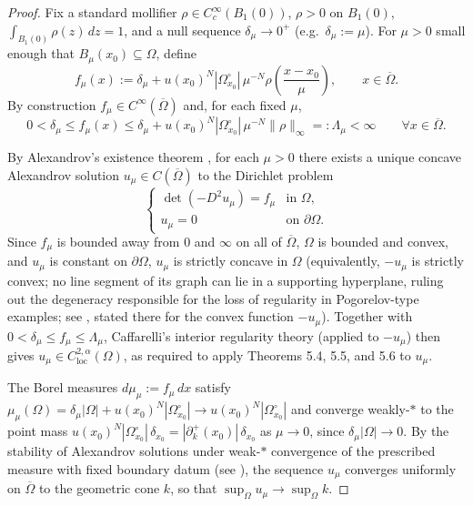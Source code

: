 \documentclass{article}
\numberwithin{equation}{section}
\begin{document}
\begin{proof}
Fix a standard mollifier $\rho \in C_c^\infty(B_1(0))$, $\rho>0$ on $B_1(0)$, $\int_{B_1(0)} \rho(z)\,dz = 1$, and a null sequence $\delta_\mu \to 0^+$ (e.g.\ $\delta_\mu:=\mu$). For $\mu>0$ small enough that $B_\mu(x_0)\subseteq\Omega$, define
\[
f_\mu(x) := \delta_\mu + u(x_0)^N |\Omega^\circ_{x_0}| \, \mu^{-N} \rho\left(\frac{x-x_0}{\mu}\right), \qquad x \in \overline\Omega.
\]
By construction $f_\mu \in C^\infty(\overline\Omega)$ and, for each fixed $\mu$,
\[
0 < \delta_\mu \le f_\mu(x) \le \delta_\mu + u(x_0)^N|\Omega^\circ_{x_0}|\,\mu^{-N}\|\rho\|_\infty =: \Lambda_\mu < \infty \qquad \forall x \in \overline\Omega.
\]

\noindent By Alexandrov's existence theorem \cite{gutierrez2016, figalli2017}, for each $\mu > 0$ there exists a unique concave Alexandrov solution $u_\mu \in C(\overline\Omega)$ to the Dirichlet problem
\[
\begin{cases}
\det(-D^2 u_\mu) = f_\mu & \text{in } \Omega, \\
u_\mu = 0 & \text{on } \partial\Omega.
\end{cases}
\]
Since $f_\mu$ is bounded away from $0$ and $\infty$ on all of $\overline\Omega$, $\Omega$ is bounded and convex, and $u_\mu$ is constant on $\partial\Omega$, $u_\mu$ is strictly concave in $\Omega$ (equivalently, $-u_\mu$ is strictly convex; no line segment of its graph can lie in a supporting hyperplane, ruling out the degeneracy responsible for the loss of regularity in Pogorelov-type examples; see \cite{caffarelli1990localization}, stated there for the convex function $-u_\mu$). Together with $0<\delta_\mu\le f_\mu\le\Lambda_\mu$, Caffarelli's interior regularity theory \cite{caffarelli1990interior, caffarelli1990localization, caffarelli1991regularity} (applied to $-u_\mu$) then gives $u_\mu \in C^{2,\alpha}_{\mathrm{loc}}(\Omega)$, as required to apply Theorems 5.4, 5.5, and 5.6 to $u_\mu$.

\noindent The Borel measures $d\mu_\mu := f_\mu \, dx$ satisfy $\mu_\mu(\Omega) = \delta_\mu|\Omega| + u(x_0)^N|\Omega^\circ_{x_0}| \to u(x_0)^N|\Omega^\circ_{x_0}|$ and converge weakly-$*$ to the point mass $u(x_0)^N|\Omega^\circ_{x_0}|\,\delta_{x_0} = |\partial^+_k(x_0)|\,\delta_{x_0}$ as $\mu \to 0$, since $\delta_\mu|\Omega|\to0$. By the stability of Alexandrov solutions under weak-$*$ convergence of the prescribed measure with fixed boundary datum (see \cite{gutierrez2016, figalli2017}), the sequence $u_\mu$ converges uniformly on $\overline\Omega$ to the geometric cone $k$, so that $\sup_\Omega u_\mu \to \sup_\Omega k$.


\end{proof}
\end{document}
